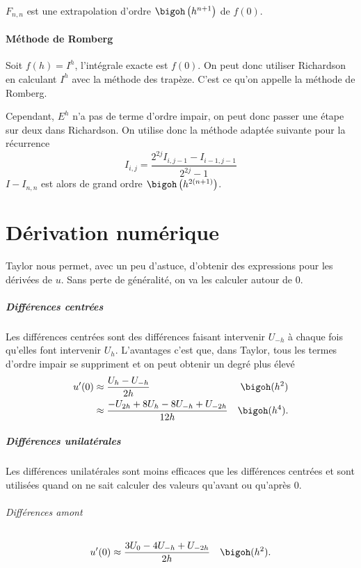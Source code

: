 $F_{n, n}$ est une extrapolation d'ordre
$\bigoh\left(h^{n+1}\right)$ de $f(0)$.


\subsection{Méthode de Romberg}
Soit $f(h) = I^h$, l'intégrale exacte est $f(0)$.
On peut donc utiliser Richardson en calculant
$I^h$ avec la méthode des trapèze.
C'est ce qu'on appelle la méthode de Romberg.

Cependant, $E^h$ n'a pas de terme d'ordre impair, on peut donc passer
une étape sur deux dans Richardson.
On utilise donc la méthode adaptée suivante pour la récurrence
\[ I_{i, j} = \frac{2^{2j} I_{i, j-1} - I_{i-1, j-1}}{2^{2j} - 1} \]
$I - I_{n, n}$ est alors de grand ordre $\bigoh\left(h^{2(n+1)}\right)$.

\part{Dérivation numérique}
Taylor nous permet, avec un peu d'astuce, d'obtenir des
expressions pour les dérivées de $u$.
Sans perte de généralité, on va les calculer autour de 0.

\subsubsection{Différences centrées}
Les différences centrées sont des différences faisant
intervenir $U_{-h}$ à chaque fois qu'elles font intervenir $U_{h}$.
L'avantages c'est que, dans Taylor, tous les termes d'ordre impair
se suppriment et on peut obtenir un degré plus élevé
\begin{align*}
  u'(0) & \approx \frac{U_h - U_{-h}}{2h} & \bigoh(h^2)\\
  & \approx \frac{-U_{2h} + 8U_h - 8U_{-h} + U_{-2h}}{12h} & \bigoh(h^4).
\end{align*}

\subsubsection{Différences unilatérales}
Les différences unilatérales sont moins efficaces que les différences
centrées et sont utilisées quand on ne sait calculer des valeurs qu'avant
ou qu'après 0.

\paragraph{Différences amont}
\begin{align*}
  u'(0) & \approx \frac{3U_0 - 4U_{-h} + U_{-2h}}{2h} & \bigoh(h^2).
\end{align*}


